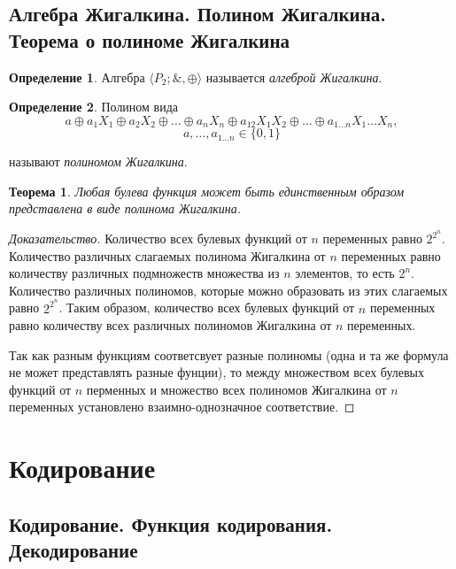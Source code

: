\documentclass{article}
\newtheorem*{theorem*}{Теорема}
\theoremstyle{plain}
\theoremstyle{definition}
\newtheorem{definition}{Определение}[subsection]
\begin{document}
\subsection{Алгебра Жигалкина. Полином Жигалкина. Теорема о полиноме Жигалкина}

\begin{definition}
	Алгебра \(\langle P_2; \&, \oplus \rangle\) называется \textit{алгеброй Жигалкина}.
\end{definition}

\begin{definition}
	Полином вида
	\[a \oplus a_1X_1 \oplus a_2X_2 \oplus \dots \oplus a_nX_n \oplus a_{12}X_1X_2 \oplus \dots \oplus a_{1\ldots n}X_1\ldots X_n,\]
	\[a, \ldots, a_{1\ldots n} \in \{0, 1\}\]

	называют \textit{полиномом Жигалкина}.
\end{definition}

\begin{theorem*}
	Любая булева функция может быть единственным образом представлена в виде полинома Жигалкина.
\end{theorem*}

\begin{proof}[Доказательство]
	Количество всех булевых функций от \(n\) переменных равно \(2^{2^n}\). Количество различных слагаемых полинома Жигалкина от \(n\) переменных равно количеству различных подмножеств множества из \(n\) элементов, то есть \(2^n\). Количество различных полиномов, которые можно образовать из этих слагаемых равно \(2^{2^n}\). Таким образом, количество всех булевых функций от \(n\) переменных равно количеству всех различных полиномов Жигалкина от \(n\) переменных.

	Так как разным функциям соответсвует разные полиномы (одна и та же формула не может представлять разные фунции), то между множеством всех булевых функций от \(n\) перменных и множество всех полиномов Жигалкина от \(n\) переменных установлено взаимно-однозначное соответствие. 
\end{proof}

\section{Кодирование}

\subsection{Кодирование. Функция кодирования. Декодирование}
\end{document}
